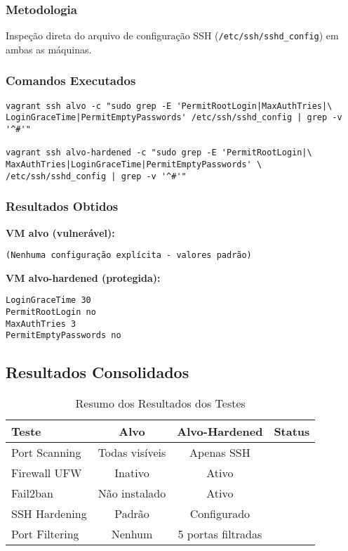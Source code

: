 \documentclass[12pt]{article}
\begin{document}
\subsubsection{Metodologia}
Inspeção direta do arquivo de configuração SSH (\texttt{/etc/ssh/sshd\_config}) em ambas as máquinas.

\subsubsection{Comandos Executados}
\begin{verbatim}
vagrant ssh alvo -c "sudo grep -E 'PermitRootLogin|MaxAuthTries|\
LoginGraceTime|PermitEmptyPasswords' /etc/ssh/sshd_config | grep -v '^#'"

vagrant ssh alvo-hardened -c "sudo grep -E 'PermitRootLogin|\
MaxAuthTries|LoginGraceTime|PermitEmptyPasswords' \
/etc/ssh/sshd_config | grep -v '^#'"
\end{verbatim}

\subsubsection{Resultados Obtidos}

\textbf{VM alvo (vulnerável):}
\begin{verbatim}
(Nenhuma configuração explícita - valores padrão)
\end{verbatim}

\textbf{VM alvo-hardened (protegida):}
\begin{verbatim}
LoginGraceTime 30
PermitRootLogin no
MaxAuthTries 3
PermitEmptyPasswords no
\end{verbatim}

\subsection{Resultados Consolidados}

\begin{table}[h]
\centering
\begin{tabular}{|l|c|c|c|}
\hline
\textbf{Teste} & \textbf{Alvo} & \textbf{Alvo-Hardened} & \textbf{Status} \\ \hline
Port Scanning & Todas visíveis & Apenas SSH & \checkmark \\ \hline
Firewall UFW & Inativo & Ativo & \checkmark \\ \hline
Fail2ban & Não instalado & Ativo & \checkmark \\ \hline
SSH Hardening & Padrão & Configurado & \checkmark \\ \hline
Port Filtering & Nenhum & 5 portas filtradas & \checkmark \\ \hline
\end{tabular}
\caption{Resumo dos Resultados dos Testes}
\end{table}
\end{document}
